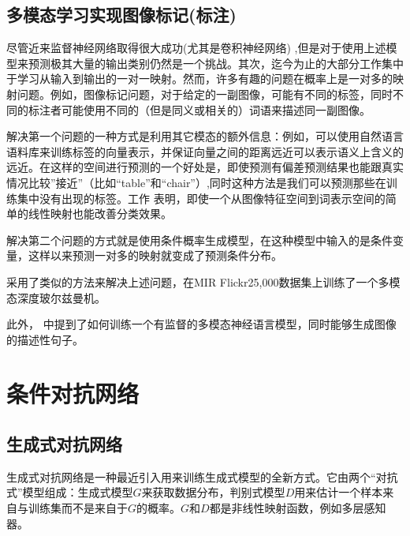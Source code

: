\documentclass{article} %
\begin{document}
\subsection{多模态学习实现图像标记(标注)}

尽管近来监督神经网络取得很大成功(尤其是卷积神经网络) \cite{Krizhevsky-2012, szegedy2014going},但是对于使用上述模型来预测极其大量的输出类别仍然是一个挑战。其次，迄今为止的大部分工作集中于学习从输入到输出的一对一映射。然而，许多有趣的问题在概率上是一对多的映射问题。例如，图像标记问题，对于给定的一副图像，可能有不同的标签，同时不同的标注者可能使用不同的（但是同义或相关的）词语来描述同一副图像。

解决第一个问题的一种方式是利用其它模态的额外信息：例如，可以使用自然语言语料库来训练标签的向量表示，并保证向量之间的距离远近可以表示语义上含义的远近。在这样的空间进行预测的一个好处是，即使预测有偏差预测结果也能跟真实情况比较”接近”（比如“table”和“chair”）,同时这种方法是我们可以预测那些在训练集中没有出现的标签。工作 \cite{frome2013devise} 表明，即使一个从图像特征空间到词表示空间的简单的线性映射也能改善分类效果。

解决第二个问题的方式就是使用条件概率生成模型，在这种模型中输入的是条件变量，这样以来预测一对多的映射就变成了预测条件分布。


\cite{Srivastava+Salakhutdinov-NIPS2012-small}采用了类似的方法来解决上述问题，在MIR Flickr25,000数据集上训练了一个多模态深度玻尔兹曼机。

此外，\cite{kiros2013multimodal} 中提到了如何训练一个有监督的多模态神经语言模型，同时能够生成图像的描述性句子。

\section{条件对抗网络}
\subsection{生成式对抗网络}
生成式对抗网络是一种最近引入用来训练生成式模型的全新方式。它由两个“对抗式”模型组成：生成式模型$G$来获取数据分布，判别式模型$D$用来估计一个样本来自与训练集而不是来自于$G$的概率。$G$和$D$都是非线性映射函数，例如多层感知器。
\end{document}
